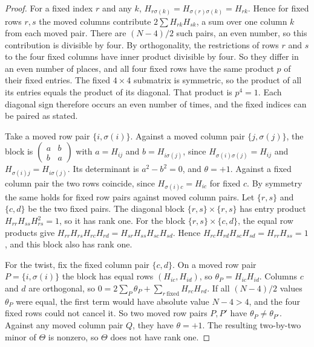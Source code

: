 \documentclass[11pt,reqno]{amsart}
\theoremstyle{remark}\newtheorem{remark}[theorem]{Remark}
\begin{document}
\begin{proof}
For a fixed index \(r\) and any \(k\), \(H_{r\sigma(k)}=H_{\sigma(r)\sigma(k)}=H_{rk}\). Hence for fixed rows \(r,s\) the moved columns contribute \(2\sum H_{rk}H_{sk}\), a sum over one column \(k\) from each moved pair. There are \((N-4)/2\) such pairs, an even number, so this contribution is divisible by four. By orthogonality, the restrictions of rows \(r\) and \(s\) to the four fixed columns have inner product divisible by four. So they differ in an even number of places, and all four fixed rows have the same product \(p\) of their fixed entries. The fixed \(4\times4\) submatrix is symmetric, so the product of all its entries equals the product of its diagonal. That product is \(p^4=1\). Each diagonal sign therefore occurs an even number of times, and the fixed indices can be paired as stated.

Take a moved row pair \(\{i,\sigma(i)\}\). Against a moved column pair \(\{j,\sigma(j)\}\), the block is \(\left(\begin{smallmatrix}a&b\\b&a\end{smallmatrix}\right)\) with \(a=H_{ij}\) and \(b=H_{i\sigma(j)}\), since \(H_{\sigma(i)\sigma(j)}=H_{ij}\) and \(H_{\sigma(i)j}=H_{i\sigma(j)}\). Its determinant is \(a^2-b^2=0\), and \(\theta=+1\). Against a fixed column pair the two rows coincide, since \(H_{\sigma(i)c}=H_{ic}\) for fixed \(c\). By symmetry the same holds for fixed row pairs against moved column pairs. Let \(\{r,s\}\) and \(\{c,d\}\) be the two fixed pairs. The diagonal block \(\{r,s\}\times\{r,s\}\) has entry product \(H_{rr}H_{ss}H_{rs}^2=1\), so it has rank one. For the block \(\{r,s\}\times\{c,d\}\), the equal row products give \(H_{rr}H_{rs}H_{rc}H_{rd}=H_{sr}H_{ss}H_{sc}H_{sd}\). Hence \(H_{rc}H_{rd}H_{sc}H_{sd}=H_{rr}H_{ss}=1\), and this block also has rank one.

For the twist, fix the fixed column pair \(\{c,d\}\). On a moved row pair \(P=\{i,\sigma(i)\}\) the block has equal rows \((H_{ic},H_{id})\), so \(\theta_P=H_{ic}H_{id}\). Columns \(c\) and \(d\) are orthogonal, so \(0=2\sum_P\theta_P+\sum_{r\ \mathrm{fixed}}H_{rc}H_{rd}\). If all \((N-4)/2\) values \(\theta_P\) were equal, the first term would have absolute value \(N-4>4\), and the four fixed rows could not cancel it. So two moved row pairs \(P,P'\) have \(\theta_P\ne\theta_{P'}\). Against any moved column pair \(Q\), they have \(\theta=+1\). The resulting two-by-two minor of \(\Theta\) is nonzero, so \(\Theta\) does not have rank one.
\end{proof}
\end{document}
